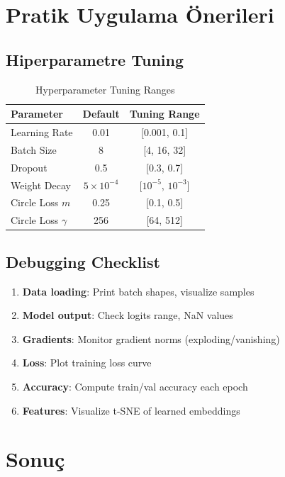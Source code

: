 \documentclass[12pt,a4paper]{article}
\begin{document}
\section{Pratik Uygulama Önerileri}

\subsection{Hiperparametre Tuning}

\begin{table}[h]
\centering
\begin{tabular}{|l|c|c|}
\hline
\textbf{Parameter} & \textbf{Default} & \textbf{Tuning Range} \\
\hline
Learning Rate & 0.01 & [0.001, 0.1] \\
Batch Size & 8 & [4, 16, 32] \\
Dropout & 0.5 & [0.3, 0.7] \\
Weight Decay & $5 \times 10^{-4}$ & [$10^{-5}$, $10^{-3}$] \\
Circle Loss $m$ & 0.25 & [0.1, 0.5] \\
Circle Loss $\gamma$ & 256 & [64, 512] \\
\hline
\end{tabular}
\caption{Hyperparameter Tuning Ranges}
\end{table}

\subsection{Debugging Checklist}
\begin{enumerate}
    \item \textbf{Data loading}: Print batch shapes, visualize samples
    \item \textbf{Model output}: Check logits range, NaN values
    \item \textbf{Gradients}: Monitor gradient norms (exploding/vanishing)
    \item \textbf{Loss}: Plot training loss curve
    \item \textbf{Accuracy}: Compute train/val accuracy each epoch
    \item \textbf{Features}: Visualize t-SNE of learned embeddings
\end{enumerate}

\section{Sonuç}
\end{document}
